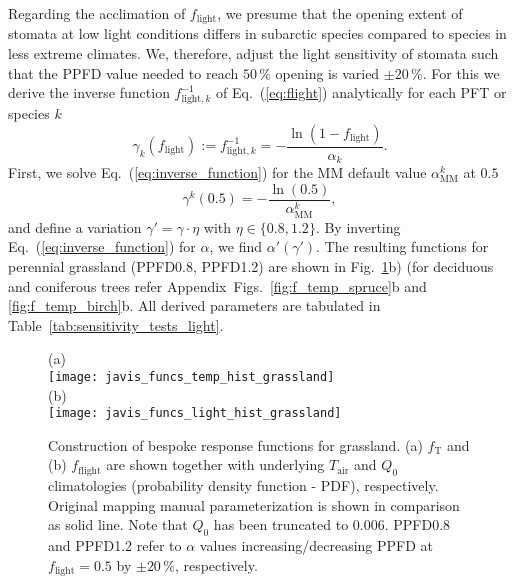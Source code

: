 \documentclass[bg, manuscript]{copernicus}
\begin{document}
Regarding the acclimation of $f_\mathrm{light}$, we presume that the opening extent of stomata at low light conditions differs in subarctic species compared to species in less extreme climates. We, therefore, adjust the light sensitivity of stomata such that the PPFD value needed to reach $50\,\unit{\%}$ opening is varied $\pm 20\,\unit{\%}$. For this we derive the inverse function $f_{\mathrm{light},k}^{-1}$ of Eq.~(\ref{eq:flight}) analytically for each PFT or species $k$
\begin{equation}
  \gamma_k(f_\mathrm{light}) := f_{\mathrm{light}, k}^{-1} = -\frac{\ln(1-f_\mathrm{light})}{\alpha_k}.
  \label{eq:inverse_function}
\end{equation}
First, we solve Eq.~(\ref{eq:inverse_function}) for the MM default value $\alpha_\mathrm{MM}^k$ at $0.5$ 
\begin{equation}
  \gamma^k(0.5) = -\frac{\ln(0.5)}{\alpha_\mathrm{MM}^k},
  \label{eq:inverse_function_halfway}
\end{equation}
and define a variation $\gamma' = \gamma \cdot \eta$ with $\eta \in \{0.8, 1.2\}$. By inverting Eq.~(\ref{eq:inverse_function}) for $\alpha$, we find $\alpha'(\gamma')$. The resulting functions for perennial grassland (PPFD0.8, PPFD1.2) are shown in Fig.~\ref{fig:f_temp_grassland}b) (for deciduous and coniferous trees refer Appendix~Figs.~\ref{fig:f_temp_spruce}b and \ref{fig:f_temp_birch}b. All derived parameters are tabulated in Table~\ref{tab:sensitivity_tests_light}.

\begin{figure}[t]
  \centering
  (a)\\
  \texttt{[image: javis\_funcs\_temp\_hist\_grassland]}\\
  (b)\\
  \texttt{[image: javis\_funcs\_light\_hist\_grassland]}
\caption{Construction of bespoke response functions for grassland. (a) $f_\mathrm{T}$ and (b) $f_\mathrm{flight}$ are shown together with underlying $T_\mathrm{air}$ and $Q_0$ climatologies (probability density function - PDF), respectively. Original mapping manual parameterization is shown in comparison as solid line. Note that $Q_0$ has been truncated to $0.006$. PPFD0.8 and PPFD1.2 refer to $\alpha$ values increasing/decreasing PPFD at $f_\mathrm{light}=0.5$ by $\pm 20\,\%$, respectively.}
\label{fig:f_temp_grassland}
\end{figure}
\end{document}
